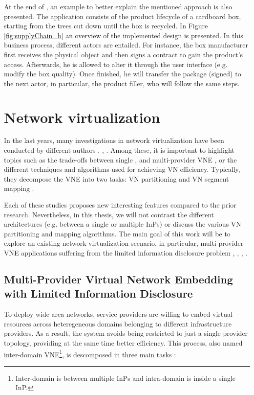 At the end of \citep{abeyratne2016blockchain}, an example to better explain the mentioned approach is also presented. The application consists of the product lifecycle of a cardboard box, starting from the trees cut down until the box is recycled. In Figure \ref{fig:supplyChain_b} an overview of the implemented design is presented. In this business process, different actors are entailed. For instance, the box manufacturer first receives the physical object and then signs a contract to gain the product's access. Afterwards, he is allowed to alter it through the user interface (e.g. modify the box quality). Once finished, he will transfer the package (signed) to the next actor, in particular, the product filler, who will follow the same steps.


\section{Network virtualization}

In the last years, many investigations in network virtualization have been conducted by different authors \citep{houidi2011virtual}, \citep{zhu2008cabernet}, \citep{chowdhury2009virtual}. Among these, it is important to highlight topics such as the trade-offs between single \citep{chowdhury2009virtual}, \citep{houidi2008distributed} and multi-provider VNE \citep{dietrich2017multi}, or the different techniques and algorithms used for achieving VN efficiency. Typically, they decompose the VNE into two tasks: VN partitioning and VN segment mapping \citep{fischer2013virtual}. 

Each of these studies proposes new interesting features compared to the prior research. Nevertheless, in this thesis, we will not contrast the different architectures (e.g. between a single or multiple InPs) or discuss the various VN partitioning and mapping algorithms. The main goal of this work will be to explore an existing network virtualization scenario, in particular, multi-provider VNE applications suffering from the limited information disclosure problem \citep{dietrich2017multi}, \citep{zaheer2010multi}, \citep{esposito2013general}, \citep{chowdhury2010polyvine}.

\subsection{Multi-Provider Virtual Network Embedding with Limited Information Disclosure}

To deploy wide-area networks, service providers are willing to embed virtual resources across heteregeneous domains belonging to different infrastructure providers. As a result, the system avoids being restricted to just a single provider topology, providing at the same time better efficiency. This process, also named inter-domain VNE\footnote{Inter-domain is between multiple InPs and intra-domain is inside a single InP.}, is descomposed in three main tasks \citep{chowdhury2010polyvine}:

